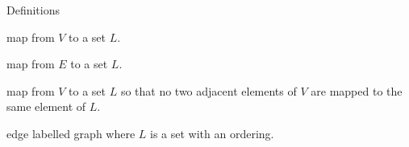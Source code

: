 \documentclass{beamer}
\begin{document}
\begin{frame}{Definitions}
  \begin{description}
    \setlength\itemsep{6mm}
    \item[Vertex labelling:] map from $V$ to a set $L$.
    \item[Edge labelling:] map from $E$ to a set $L$.
    \item[Vertex colouring:] map from $V$ to a set $L$ so that no two adjacent elements of $V$ are mapped to the same element of $L$.
    \item[Weighted graph:] edge labelled graph where $L$ is a set with an ordering.
  \end{description}
\end{frame}
\end{document}
